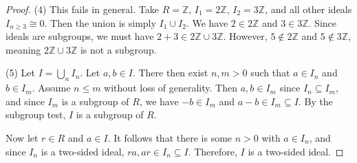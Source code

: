 \documentclass[11pt, letterpaper]{article}
\theoremstyle{plain}
\begin{document}
\begin{proof}
	(4) This fails in general. Take $R=\mathbb{Z} $, $I_1=2\mathbb{Z} $, $I_2=3\mathbb{Z} $, and all other ideals $I_{n\geq 3} \cong 0$. Then the union is simply $I_1 \cup I_2$. We have $2\in2\mathbb{Z} $ and $3\in3\mathbb{Z} $. Since ideals are subgroups, we must have $2+3\in2\mathbb{Z} \cup 3\mathbb{Z} $. However, $5 \notin 2\mathbb{Z} $ and $5\notin 3\mathbb{Z} $, meaning $2\mathbb{Z} \cup 3\mathbb{Z} $ is not a subgroup.

	(5) Let $I=\bigcup_{n} I_n$. Let $a,b\in I$. There then exist $n,m>0$ such that $a\in I_n$ and $b\in I_m$. Assume $n\leq m$ without loss of generality. Then $a,b\in I_m$ since $I_n \subseteq I_m$, and since $I_m$ is a subgroup of $R$, we have $-b\in I_m$ and $a-b\in I_m \subseteq I$. By the subgroup test, $I$ is a subgroup of $R$.

	Now let $r\in R$ and $a\in I$. It follows that there is some $n>0$ with $a\in I_n$, and since $I_n$ is a  two-sided ideal, $ra,ar\in I_n \subseteq I$. Therefore, $I$ is a two-sided ideal.
\end{proof}
\end{document}
